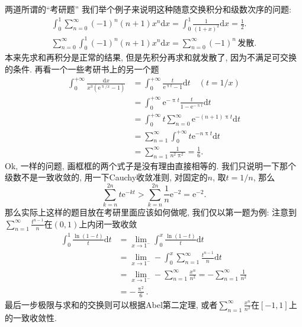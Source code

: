 \documentclass[UTF8,no-math,12pt,openany,table,dvipsnames,svgnames]{book}
\newcommand{\ee}{\mathrm e}
\renewcommand{\pi}{\uppi}
\begin{document}
\begin{MYBOX}[colbacktitle=blue]{两道所谓的“考研题”}
我们举个例子来说明这种随意交换积分和级数次序的问题:
\begin{gather*}
  \int_0^1\sum_{n=0}^\infty(-1)^n(n+1)x^n\mathrm dx=\int_0^1\frac{1}{(1+x)^2}\mathrm dx=\frac12.\\
  \sum_{n=0}^\infty\int_0^1(-1)^n(n+1)x^n\mathrm dx=\sum_{n=0}^\infty(-1)^n\,\text{发散}.
\end{gather*}
本来先求和再积分是正常的结果, 但是先积分再求和就发散了, 因为不满足可交换的条件. 再看一个一些考研书上的另一个题
\begin{align*}
  \int_0^{+\infty}\frac{\mathrm dx}{x^3(\ee^{\pi/x}-1)}
    & = \int_0^{+\infty}\frac{t}{\ee^{\pi t}-1}\mathrm dt\quad (t=1/x)\\
    & = \int_0^{+\infty}\ee^{-\pi t}\frac t{1-\ee^{-\pi t}}\mathrm dt\\
    & = \boxed{\int_0^{+\infty}t\sum_{n=0}^\infty\ee^{-(n+1)\pi t}\mathrm dt}\\
    & = \boxed{\sum_{n=1}^\infty\int_0^{+\infty}t\ee^{-n\pi t}\mathrm dt}\\
    & = \sum_{n=1}^\infty\frac1{n^2\pi^2}=\frac16.
\end{align*}
Ok, 一样的问题, 画框框的两个式子是没有理由直接相等的. 我们只说明一下那个级数不是一致收敛的, 用一下Cauchy收敛准则, 对固定的$n$, 取$t=1/n$, 那么
  \[ \sum_{k=n}^{2n}t\ee^{-kt}>\sum_{k=n}^{2n}\frac1n\ee^{-2}=\ee^{-2}. \]
那么实际上这样的题目放在考研里面应该如何做呢, 我们仅以第一题为例: 注意到$\sum_{n=1}^\infty\frac{t^{n-1}}n$在$(0,1)$上内闭一致收敛
\begin{align*}
  \int_0^1\frac{\ln(1-t)}t\mathrm dt
  & = \lim_{x\to1^-}\int_0^x\frac{\ln(1-t)}t\mathrm dt\\
  & = \lim_{x\to1^-}-\int_0^x\sum_ {n=1}^\infty\frac{t^{n-1}}n\mathrm dt\\
  & = \lim_{x\to1^-}-\sum_{n=1}^\infty\frac{x^n}{n^2}=-\sum_{n=1}^\infty\frac1{n^2}\\
  & = -\frac{\pi^2}6.
\end{align*}
最后一步极限与求和的交换则可以根据Abel第二定理, 或者$\sum_{n=1}^\infty\frac{x^n}{n^2}$在$[-1,1]$上的一致收敛性.
\end{MYBOX}
\end{document}
